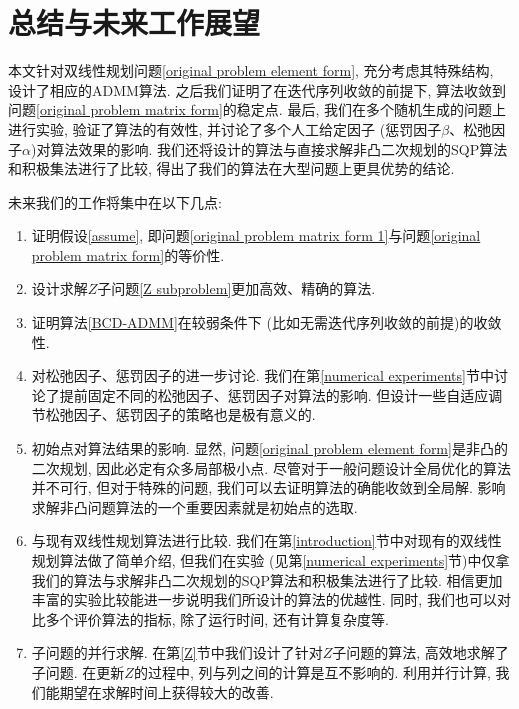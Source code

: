 \section{总结与未来工作展望}\label{conclusion}
本文针对双线性规划问题\eqref{original problem element form}, 充分考虑其特殊结构, 设计了相应的ADMM算法. 之后我们证明了在迭代序列收敛的前提下, 算法收敛到问题\eqref{original problem matrix form}的稳定点. 最后, 我们在多个随机生成的问题上进行实验, 验证了算法的有效性, 并讨论了多个人工给定因子 (惩罚因子$\beta$、松弛因子$\alpha$)对算法效果的影响. 我们还将设计的算法与直接求解非凸二次规划的SQP算法和积极集法进行了比较, 得出了我们的算法在大型问题上更具优势的结论. 
\par 未来我们的工作将集中在以下几点:
\begin{enumerate}
\item 证明假设\ref{assume}, 即问题\eqref{original problem matrix form 1}与问题\eqref{original problem matrix form}的等价性. 
\item 设计求解$Z$子问题\eqref{Z subproblem}更加高效、精确的算法.
\item 证明算法\ref{BCD-ADMM}在较弱条件下 (比如无需迭代序列收敛的前提)的收敛性.
\item 对松弛因子、惩罚因子的进一步讨论. 我们在第\ref{numerical experiments}节中讨论了提前固定不同的松弛因子、惩罚因子对算法的影响. 但设计一些自适应调节松弛因子、惩罚因子的策略也是极有意义的.
\item 初始点对算法结果的影响. 显然, 问题\eqref{original problem element form}是非凸的二次规划, 因此必定有众多局部极小点. 尽管对于一般问题设计全局优化的算法并不可行, 但对于特殊的问题, 我们可以去证明算法的确能收敛到全局解. 影响求解非凸问题算法的一个重要因素就是初始点的选取.
\item 与现有双线性规划算法进行比较. 我们在第\ref{introduction}节中对现有的双线性规划算法做了简单介绍, 但我们在实验 (见第\ref{numerical experiments}节)中仅拿我们的算法与求解非凸二次规划的SQP算法和积极集法进行了比较. 相信更加丰富的实验比较能进一步说明我们所设计的算法的优越性. 同时, 我们也可以对比多个评价算法的指标, 除了运行时间, 还有计算复杂度等. 
\item 子问题的并行求解. 在第\ref{Z}节中我们设计了针对$Z$子问题的算法, 高效地求解了子问题. 在更新$Z$的过程中, 列与列之间的计算是互不影响的. 利用并行计算, 我们能期望在求解时间上获得较大的改善.
\end{enumerate}